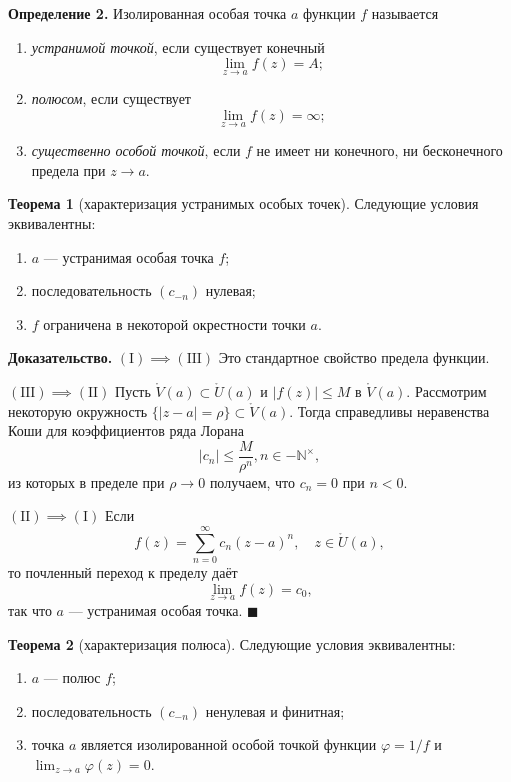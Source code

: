 \documentclass[12pt, a4paper]{article}
\theoremstyle{definition}
\theoremstyle{remark}
\begin{document}
\textbf{Определение 2.} Изолированная особая точка $a$ функции $f$ называется
\begin{enumerate}
	\item[(\text{I})] \textit{устранимой точкой}, если существует конечный
	$$\lim_{z \to a} f(z) = A;$$
	\item[(\text{II})] \textit{полюсом}, если существует
	$$\lim_{z \to a} f(z) = \infty;$$
	\item[(\text{III})] \textit{существенно особой точкой}, если $f$ не имеет ни конечного, ни бесконечного предела при $z \to a$.
\end{enumerate}

\textbf{Теорема 1} (характеризация устранимых особых точек). Следующие условия эквивалентны:
\begin{enumerate}
	\item[(\text{I})] $a$ --- устранимая особая точка $f$;
	\item[(\text{II})] последовательность $(c_{-n})$ нулевая;
	\item[(\text{III})] $f$ ограничена в некоторой окрестности точки $a$.
\end{enumerate}

\textbf{Доказательство.} $(\text{I}) \implies (\text{III})$ Это стандартное свойство предела функции.

$(\text{III}) \implies (\text{II})$ Пусть $\mathring{V}(a) \subset \mathring{U}(a)$ и $|f(z)| \le M$ в $\mathring{V}(a)$. Рассмотрим некоторую окружность $\{|z - a| = \rho\} \subset \mathring{V}(a)$. Тогда справедливы неравенства Коши для коэффициентов ряда Лорана
$$|c_n| \le \frac{M}{\rho^n}, n \in -\mathbb{N}^\times,$$
из которых в пределе при $\rho \to 0$ получаем, что $c_n = 0$ при $n < 0$.

$(\text{II}) \implies (\text{I})$ Если
$$f(z) = \sum_{n=0}^{\infty} c_n (z - a)^n, \quad z \in \mathring{U}(a),$$
то почленный переход к пределу даёт
$$\lim_{z \to a} f(z) = c_0,$$
так что $a$ --- устранимая особая точка. $\blacksquare$

\textbf{Теорема 2} (характеризация полюса). Следующие условия эквивалентны:
\begin{enumerate}
	\item[(\text{I})] $a$ --- полюс $f$;
	\item[(\text{II})] последовательность $(c_{-n})$ ненулевая и финитная;
	\item[(\text{III})] точка $a$ является изолированной особой точкой функции $\varphi = 1/f$ и $\lim_{z \to a} \varphi(z) = 0$.
\end{enumerate}
\end{document}

